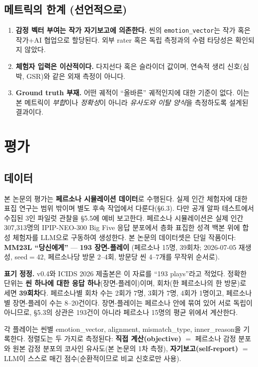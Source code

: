 \documentclass[11pt, a4paper]{article}
\begin{document}
\subsection{메트릭의 한계 (선언적으로)}
\begin{enumerate}
  \item \textbf{감정 벡터 부여는 작가 자기보고에 의존한다.} 씬의 \texttt{emotion\_vector}는 작가 혹은 작가+AI 협업으로 할당된다. 외부 rater 혹은 독립 측정과의 수렴 타당성은 확인되지 않았다.
  \item \textbf{체험자 입력은 이산적이다.} 다지선다 혹은 슬라이더 값이며, 연속적 생리 신호(심박, GSR)와 같은 외재 측정이 아니다.
  \item \textbf{Ground truth 부재.} 어떤 궤적이 ``올바른'' 궤적인지에 대한 기준이 없다. 이는 본 메트릭이 \textit{부합}이나 \textit{정확성}이 아니라 \textit{유사도와 이탈 양식}을 측정하도록 설계된 결과이다.
\end{enumerate}

\section{평가}

\subsection{데이터}
본 논문의 평가는 \textbf{페르소나 시뮬레이션 데이터}로 수행된다. 실제 인간 체험자에 대한 표집 연구는 범위 밖이며 별도 후속 작업에서 다룬다(\S6.3). 다만 공개 알파 테스트에서 수집된 3인 파일럿 관찰을 \S5.5에 예비 보고한다. 페르소나 시뮬레이션은 실제 인간 307{,}313명의 IPIP-NEO-300 Big Five 응답 분포에서 층화 표집한 성격 백본 위에 합성 체험자를 LLM으로 구동하여 생성한다. 본 논문의 데이터셋은 단일 작품이다: \textbf{MM23L ``당신에게''} --- \textbf{193 장면-플레이} (페르소나 15명, 39회차; 2026-07-05 재생성, seed$=$42, 페르소나당 방문 2--4회, 방문당 씬 4--7개를 무작위 순서로).

\noindent\textbf{표기 정정.} v0.4와 ICIDS 2026 제출본은 이 자료를 ``193 plays''라고 적었다. 정확한 단위는 \textbf{씬 하나에 대한 응답 하나}(장면-플레이)이며, 회차(한 페르소나의 한 방문)로 세면 \textbf{39회차}다. 페르소나별 회차 수는 2회가 7명, 3회가 7명, 4회가 1명이고, 페르소나별 장면-플레이 수는 8--20건이다. 장면-플레이는 페르소나 안에 묶여 있어 서로 독립이 아니므로, \S5.3의 상관은 193건이 아니라 페르소나 15명의 평균 위에서 계산한다.

각 플레이는 씬별 emotion\_vector, alignment, mismatch\_type, inner\_reason을 기록한다. 정렬도는 두 가지로 측정된다: \textbf{직접 계산(objective)} $=$ 페르소나 감정 분포와 원본 감정 분포의 코사인 유사도(본 논문의 1차 측정), \textbf{자기보고(self-report)} $=$ LLM이 스스로 매긴 점수(순환적이므로 비교 신호로만 사용).
\end{document}
